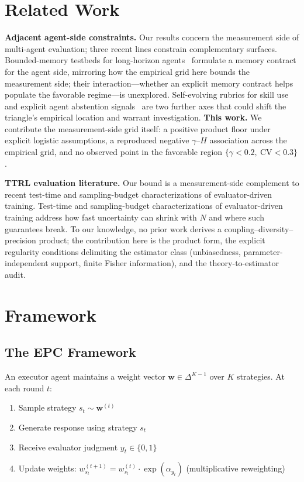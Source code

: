 \documentclass[11pt]{article}
\begin{document}
\section{Related Work}



\textbf{Adjacent agent-side constraints.} Our results concern the
measurement side of multi-agent evaluation; three recent lines constrain
complementary surfaces. Bounded-memory testbeds for long-horizon
agents~\cite{cheng2026agenticsts} formulate a memory contract for the agent
side, mirroring how the empirical grid here bounds the measurement side;
their interaction---whether an explicit memory contract helps populate the
favorable regime---is unexplored. Self-evolving rubrics for skill
use~\cite{zhu2026skillcoach} and explicit agent abstention
signals~\cite{luo2026abstention} are two further axes that could shift the
triangle's empirical location and warrant investigation. \textbf{This
work.} We contribute the measurement-side grid itself: a positive product
floor under explicit logistic assumptions, a reproduced negative
$\gamma$--$H$ association across the empirical grid, and no observed point
in the favorable region $\{\gamma < 0.2,\ \mathrm{CV} < 0.3\}$.

\textbf{TTRL evaluation literature.} Our bound is a measurement-side complement to recent test-time and sampling-budget characterizations of evaluator-driven training. Test-time and sampling-budget characterizations of evaluator-driven training address how fast uncertainty can shrink with $N$ and where such guarantees break. To our knowledge, no prior work derives a coupling--diversity--precision product; the contribution here is the product form, the explicit regularity conditions delimiting the estimator class (unbiasedness, parameter-independent support, finite Fisher information), and the theory-to-estimator audit.
\section{Framework}

\subsection{The EPC Framework}

An executor agent maintains a weight vector $\mathbf{w} \in \Delta^{K-1}$ over $K$ strategies. At each round $t$:
\begin{enumerate}[leftmargin=*,nosep]
 \item Sample strategy $s_t \sim \mathbf{w}^{(t)}$
 \item Generate response using strategy $s_t$
 \item Receive evaluator judgment $y_t \in \{0, 1\}$
 \item Update weights: $w_{s_t}^{(t+1)} = w_{s_t}^{(t)} \cdot \exp(\alpha_{y_t})$ (multiplicative reweighting)
\end{enumerate}
\end{document}
